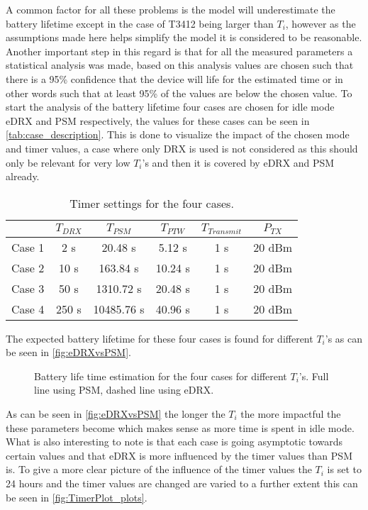 A common factor for all these problems is the model will underestimate the battery lifetime except in the case of T3412 being larger than $T_i$, however as the assumptions made here helps simplify the model it is considered to be reasonable. Another important step in this regard is that for all the measured parameters a statistical analysis was made, based on this analysis values are chosen such that there is a 95\% confidence that the device will life for the estimated time or in other words such that at least 95\% of the values are below the chosen value. To start the analysis of the battery lifetime four cases are chosen for idle mode eDRX and PSM respectively, the values for these cases can be seen in \autoref{tab:case_description}. This is done to visualize the impact of the chosen mode and timer values, a case where only DRX is used is not considered as this should only be relevant for very low $T_i$'s and then it is covered by eDRX and PSM already.

\begin{table}[H]
\centering
\begin{tabular}{|c|c|c|c|c|c|} \hline
		& $T_{DRX}$	& $T_{PSM}$	& $T_{PTW}$	& $T_{Transmit}$	& $P_{TX}$ 	\\ \hline
Case 1	& 2 s 		& 20.48 s	& 5.12 s	& 1 s				& 20 dBm	\\ \hline
Case 2	& 10 s		& 163.84 s	& 10.24 s	& 1 s				& 20 dBm	\\ \hline
Case 3	& 50 s		& 1310.72 s	& 20.48 s	& 1 s				& 20 dBm	\\ \hline
Case 4	& 250 s		& 10485.76 s& 40.96 s	& 1 s				& 20 dBm	\\ \hline
\end{tabular}
\caption{Timer settings for the four cases.}
\label{tab:case_description}
\end{table}

The expected battery lifetime for these four cases is found for different $T_i$'s as can be seen in \autoref{fig:eDRXvsPSM}.

\begin{figure}[H]
\centering
{}
\resizebox{0.7\textwidth}{!}{
}
\caption{Battery life time estimation for the four cases for different $T_i$'s. Full line using PSM, dashed line using eDRX.}
\label{fig:eDRXvsPSM}
\end{figure}

As can be seen in \autoref{fig:eDRXvsPSM} the longer the $T_i$ the more impactful the these parameters become which makes sense as more time is spent in idle mode. What is also interesting to note is that each case is going asymptotic towards certain values and that eDRX is more influenced by the timer values than PSM is. To give a more clear picture of the influence of the timer values the $T_i$ is set to 24 hours and the timer values are changed are varied to a further extent this can be seen in \autoref{fig:TimerPlot_plots}.


